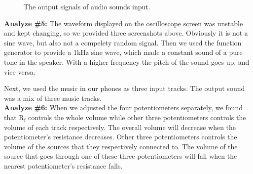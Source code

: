 \begin{figure}[!htbp]
\begin{framed}
		\caption{The output signals of audio sounds input.}
		\label{fig:pre11} 
	\end{framed}
\end{figure}

\textbf{Analyze \#5:} \newline
\phantom{ } The waveform displayed on the oscilloscope screen was unstable and kept changing, so we provided three screenshots above. Obviously it is not a sine wave, but also not a compelety random signal. Then we used the function generator to provide a 1kHz sine wave, which made a constant sound of a pure tone in the speaker. With a higher frequency the pitch of the sound goes up, and vice versa.

\phantom{ } Next, we used the music in our phones as three input tracks. The output sound was a mix of three music tracks.\\

\textbf{Analyze \#6:} \newline
\phantom{ } When we adjusted the four potentiometers separately, we found that $ \mathrm{R_f} $ controls the whole volume while other three potentiometers controls the volume of each track respectively. The overall volume will decrease when the potentiometer's resistance decreases. Other three potentiometers controls the volume of the sources that they respectively connected to. The volume of the source that goes through one of these three potentiometers will fall when the nearest potentiometer's resistance falls. 